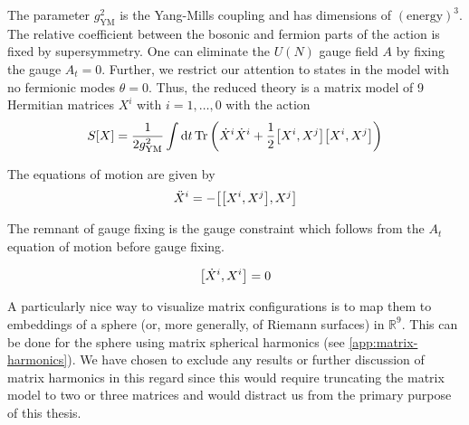 The parameter $g_\mathrm{YM}^2$ is the Yang-Mills coupling and has dimensions of $(\mathrm{energy})^3$. The relative coefficient between the bosonic and fermion parts of the action is fixed by supersymmetry. One can eliminate the $U(N)$ gauge field $A$ by fixing the gauge $A_t = 0$. Further, we restrict our attention to states in the model with no fermionic modes $\theta = 0$. Thus, the reduced theory is a matrix model of 9 Hermitian matrices $X^i$ with $i = 1, \ldots, 0$ with the action
\begin{equation}\label{eqn:reduced-bfss-action}
    S[X] = \frac{1}{2 g_\mathrm{YM}^2} \int \text{d}t \Tr \left( \dot{X}^i \dot{X}^i + \frac{1}{2} \comm{X^i}{X^j}\comm{X^i}{X^j} \right)
\end{equation}


The equations of motion are given by
\begin{equation}\label{eqn:eom}
    \ddot{X}^i = -\comm{\comm{X^i}{X^j}}{X^j}
\end{equation}

The remnant of gauge fixing is the gauge constraint which follows from the $A_t$ equation of motion before gauge fixing.

\begin{equation}
    \comm{\dot{X}^i}{X^i} = 0
\end{equation}

A particularly nice way to visualize matrix configurations is to map them to embeddings of a sphere (or, more generally, of Riemann surfaces) in $\mathbb{R}^9$. This can be done for the sphere using matrix spherical harmonics (see \cref{app:matrix-harmonics}). We have chosen to exclude any results or further discussion of matrix harmonics in this regard since this would require truncating the matrix model to two or three matrices and would distract us from the primary purpose of this thesis. 

